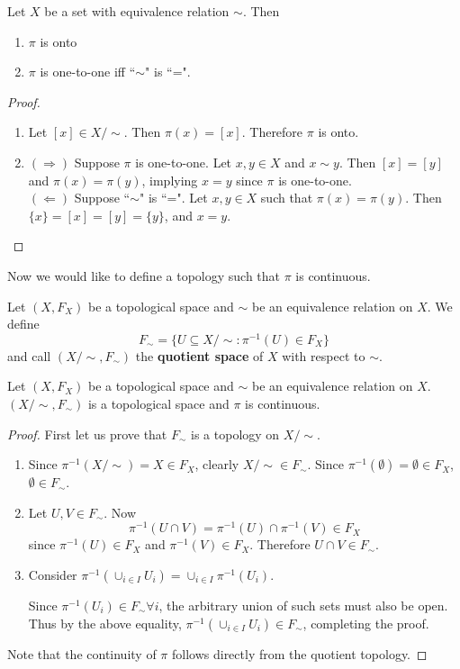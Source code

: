 \begin{tinyfact}
	Let $X$ be a set with equivalence relation $\sim$. Then 
	\begin{enumerate}
		\item $\pi$ is onto 
		\item $\pi$ is one-to-one iff ``$\sim$" is ``=". 
	\end{enumerate}
\end{tinyfact}
\begin{proof}
	\begin{enumerate}
		\item Let $[x] \in X / \sim$. Then $\pi(x) = [x]$. Therefore $\pi$ is onto. 
		\item $(\Rightarrow)$ Suppose $\pi$ is one-to-one. Let $x,y \in X$ and $x \sim y$. Then $[x] = [y]$ and $\pi(x) = \pi(y)$, implying $x = y$ since $\pi$ is one-to-one.\\
		$(\Leftarrow)$ Suppose ``$\sim$" is ``=". Let $x,y \in X$ such that $\pi(x) = \pi(y)$. Then $\{x\} = [x] = [y] = \{y\}$, and $x = y$. 
	\end{enumerate}
\end{proof}

Now we would like to define a topology such that $\pi$ is continuous. 
\begin{definition}
	Let $(X, F_X)$ be a topological space and $\sim$ be an equivalence relation on $X$. We define
	\[F_{\sim} = \{U \subseteq X / \sim : \pi^{-1}(U) \in F_X\}\]
	and call $(X / \sim, F_{\sim})$ the {\bf quotient space} of $X$ with respect to $\sim$. 
\end{definition}
\begin{smallfact}
	Let $(X, F_X)$ be a topological space and $\sim$ be an equivalence relation on $X$. $(X / \sim, F_{\sim})$ is a topological space and $\pi$ is continuous. 
\end{smallfact}
\begin{proof}
	First let us prove that $F_{\sim}$ is a topology on $X / \sim$. 
	\begin{enumerate}
		\item Since $\pi^{-1}(X / \sim) = X \in F_X$, clearly $X / \sim \in F_{\sim}$. Since $\pi^{-1}(\emptyset) = \emptyset \in F_X$, $\emptyset \in F_{\sim}$. 
		\item Let $U, V \in F_{\sim}$. Now $$\pi^{-1}(U \cap V) = \pi^{-1}(U) \cap \pi^{-1}(V) \in F_X$$ since $ \pi^{-1}(U) \in F_X$ and $\pi^{-1}(V) \in F_X$. Therefore $U \cap V \in F_{\sim}$. 
		\item Consider $\pi^{-1}(\cup_{i \in I}U_{i}) = \cup_{i \in I} \pi^{-1}(U_{i})$.
		
		Since $\pi^{-1}(U_{i}) \in F_{\sim} \forall i$, the arbitrary union of such sets must also be open. Thus by the above equality, $\pi^{-1}(\cup_{i \in I}U_{i}) \in F_{\sim}$, completing the proof. 
	\end{enumerate}
	Note that the continuity of $\pi$ follows directly from the quotient topology. 
\end{proof}

